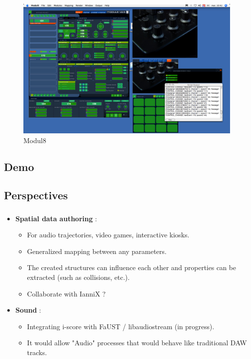 \documentclass[12pt,t]{beamer}
\makeatletter
\newcommand*{\currentname}{\@currentlabelname}
\makeatother
\begin{document}
\begin{frame}
    \frametitle{\currentname}
    \centering
    \begin{figure}
        \includegraphics[scale=0.2]{images/modul8.jpg}
        \caption{Modul8}
    \end{figure}
\end{frame}


\subsection{Demo}


\subsection{Perspectives}
\begin{frame}
    \frametitle{\currentname}
    \begin{itemize}
        \item \textbf{Spatial data authoring} :
        
        \begin{itemize}
            \item For audio trajectories, video games, interactive kiosks.
            \item Generalized mapping between any parameters. 
            \item The created structures can influence each other and properties can be 
            extracted (such as collisions, etc.).
            \item Collaborate with IanniX ?
        \end{itemize}
        
        \item \textbf{Sound} : 
        \begin{itemize}
            \item Integrating i-score with FaUST / libaudiostream (in progress).
            \item It would allow "Audio" processes that would behave like traditional DAW tracks.
        \end{itemize}
    \end{itemize}
\end{frame}
\end{document}

